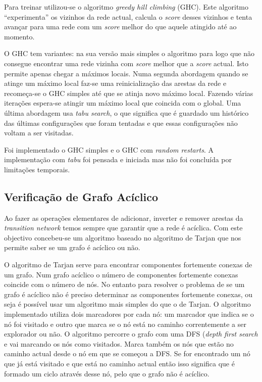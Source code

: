 \documentclass[a4paper]{article}
\begin{document}
      Para treinar utilizou-se o algoritmo \textit{greedy hill climbing} (GHC). Este algoritmo ``experimenta'' os vizinhos da rede actual, calcula o \textit{score} desses vizinhos e tenta avançar para uma rede com um \textit{score} melhor do que aquele atingido até ao momento.
      
      O GHC tem variantes: na sua versão mais simples o algoritmo para logo que não consegue encontrar uma rede vizinha com \textit{score} melhor que a \textit{score} actual. Isto permite apenas chegar a máximos locais. Numa segunda abordagem quando se atinge um máximo local faz-se uma reinicialização das arestas da rede e recomeça-se o GHC simples até que se atinja novo máximo local. Fazendo várias iterações espera-se atingir um máximo local que coincida com o global. Uma última abordagem usa \textit{tabu search}, o que significa que é guardado um histórico das últimas configurações que foram tentadas e que essas configurações não voltam a ser visitadas.
      
      Foi implementado o GHC simples e o GHC com \textit{random restarts}. A implementação com \textit{tabu} foi pensada e iniciada mas não foi concluída por limitações temporais.

      \subsection{Verificação de Grafo Acíclico}
      
      Ao fazer as operações elementares de adicionar, inverter e remover arestas da \textit{transition network} temos sempre que garantir que a rede é acíclica. Com este objectivo concebeu-se um algoritmo baseado no algoritmo de Tarjan que nos permite saber se um grafo é acíclico ou não.
      
      O algoritmo de Tarjan serve para encontrar componentes fortemente conexas de um grafo. Num grafo acíclico o número de componentes fortemente conexas coincide com o número de nós. No entanto para resolver o problema de se um grafo é acíclico não é preciso determinar as componentes fortemente conexas, ou seja é possível usar um algoritmo mais simples do que o de Tarjan. O algoritmo implementado utiliza dois marcadores por cada nó: um marcador que indica se o nó foi visitado e outro que marca se o nó está no caminho correntemente a ser explorador ou não. O algoritmo percorre o grafo com uma DFS (\textit{depth first search} e vai marcando os nós como visitados. Marca também os nós que estão no caminho actual desde o nó em que se começou a DFS. Se for encontrado um nó que já está visitado e que está no caminho actual então isso significa que é formado um ciclo através desse nó, pelo que o grafo não é acíclico.
      
\end{document}
